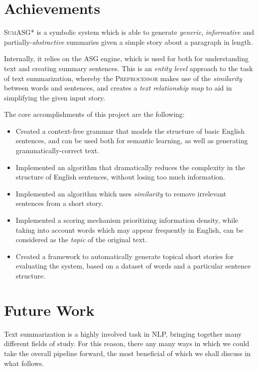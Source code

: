 \section{Achievements}

\textsc{SumASG*} is a symbolic system which is able to generate \textit{generic}, \textit{informative} and partially-\textit{abstractive} summaries given a simple story about a paragraph in length.

Internally, it relies on the ASG engine, which is used for both for understanding text and creating summary sentences. This is an \textit{entity level} approach to the task of text summarization, whereby the \textsc{Preprocessor} makes use of the \textit{similarity} between words and sentences, and creates a \textit{text relationship map} to aid in simplifying the given input story.

The core accomplishments of this project are the following:

\begin{itemize}
\item Created a context-free grammar that models the structure of basic English sentences, and can be used both for semantic learning, as well as generating grammatically-correct text.
\item Implemented an algorithm that dramatically reduces the complexity in the structure of English sentences, without losing too much information.
\item Implemented an algorithm which uses \textit{similarity} to remove irrelevant sentences from a short story.
\item Implemented a scoring mechanism prioritizing information density, while taking into account words which may appear frequently in English, can be considered as the \textit{topic} of the original text.
\item Created a framework to automatically generate topical short stories for evaluating the system, based on a dataset of words and a particular sentence structure.
\end{itemize}

\section{Future Work}

Text summarization is a highly involved task in NLP, bringing together many different fields of study. For this reason, there any many ways in which we could take the overall pipeline forward, the most beneficial of which we shall discuss in what follows.

